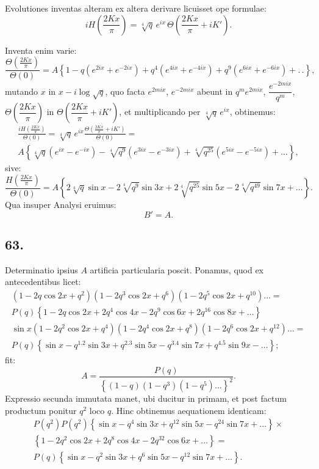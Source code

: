 \documentclass{article}
\begin{document}
Evolutiones inventas alteram ex altera derivare licuisset ope formulae:
\[
iH\left(\frac{2Kx}{\pi}\right)=\sqrt[4]{q}\,e^{ix}\,\Theta\left(\frac{2Kx}{\pi}+iK'\right).
\]

Inventa enim varie:
\[
\frac{\Theta\left(\frac{2Kx}{\pi}\right)}{\Theta(0)}=A\left\{1-q(e^{2ix}+e^{-2ix})+q^{4}(e^{4ix}+e^{-4ix})+q^{9}(e^{6ix}+e^{-6ix})+.\,.\right\},
\]
mutando $x$ in $x-i\log\sqrt{q}$, quo facta $e^{2mix}$, $e^{-2mix}$ abeunt in $q^{m}e^{2mix}$, $\dfrac{e^{-2mix}}{q^{m}}$, $\Theta\left(\dfrac{2Kx}{\pi}\right)$ in $\Theta\left(\dfrac{2Kx}{\pi}+iK'\right)$, et multiplicando per $\sqrt[4]{q}\,e^{ix}$, obtinemus:
\[
\begin{gathered}
\frac{iH\left(\frac{2Kx}{\pi}\right)}{\Theta(0)}=\sqrt[4]{q}\,e^{ix}\frac{\Theta\left(\frac{2Kx}{\pi}+iK'\right)}{\Theta(0)}=\\[1.5ex]
A\left\{\sqrt[4]{q}(e^{ix}-e^{-ix})-\sqrt[4]{q^{9}}(e^{3ix}-e^{-3ix})+\sqrt[4]{q^{25}}(e^{5ix}-e^{-5ix})+\ldots\right\},
\end{gathered}
\]
sive:
\[
\frac{H\left(\frac{2Kx}{\pi}\right)}{\Theta(0)}=A\left\{2\sqrt[4]{q}\sin x-2\sqrt[4]{q^{9}}\sin 3x+2\sqrt[4]{q^{25}}\sin 5x-2\sqrt[4]{q^{49}}\sin 7x+\ldots\right\}.
\]
Qua insuper Analysi eruimus:
\[
B'=A.
\]

\subsection*{63.}

Determinatio ipsius $A$ artificia particularia poscit. Ponamus, quod ex antecedentibus licet:
\[
\begin{gathered}
(1-2q\cos 2x+q^{2})(1-2q^{3}\cos 2x+q^{6})(1-2q^{5}\cos 2x+q^{10})\ldots=\\[1ex]
P(q)\left\{1-2q\cos 2x+2q^{4}\cos 4x-2q^{9}\cos 6x+2q^{16}\cos 8x+\ldots\right\}\\[1ex]
\sin x(1-2q^{2}\cos 2x+q^{4})(1-2q^{4}\cos 2x+q^{8})(1-2q^{6}\cos 2x+q^{12})\ldots=\\[1ex]
P(q)\left\{\sin x-q^{1.2}\sin 3x+q^{2.3}\sin 5x-q^{3.4}\sin 7x+q^{4.5}\sin 9x-\ldots\right\};
\end{gathered}
\]
fit:
\[
A=\frac{P(q)}{\left\{(1-q)(1-q^{3})(1-q^{5})\ldots\right\}^{2}}.
\]
Expressio secunda immutata manet, ubi ducitur in primam, et post factum productum ponitur $q^{2}$ loco $q$. Hinc obtinemus aequationem identicam:
\[
\begin{gathered}
P(q^{2})P(q^{2})\left\{\sin x-q^{4}\sin 3x+q^{12}\sin 5x-q^{24}\sin 7x+\ldots\right\}\times\\[1ex]
\left\{1-2q^{2}\cos 2x+2q^{8}\cos 4x-2q^{32}\cos 6x+\ldots\right\}=\\[1ex]
P(q)\left\{\sin x-q^{2}\sin 3x+q^{6}\sin 5x-q^{12}\sin 7x+\ldots\right\}.
\end{gathered}
\]
\end{document}
